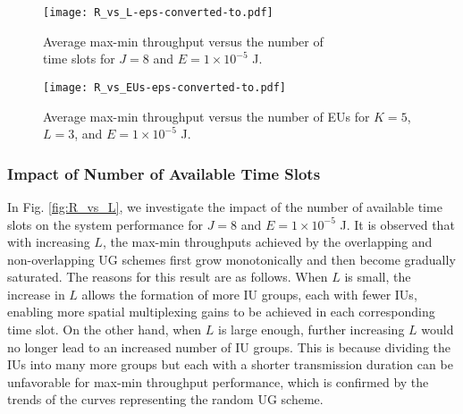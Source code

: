 \documentclass[12pt,draftclsnofoot, onecolumn]{IEEEtran}
\theoremstyle{plain}
\begin{document}
\begin{sloppypar}
\begin{figure}[!t]
	\begin{minipage}[t]{0.5\linewidth}
		\hspace{-3mm}
		\texttt{[image: R\_vs\_L-eps-converted-to.pdf]}\vspace{-1.5mm}
		\caption{Average max-min throughput versus the number of\\ time slots for $J = 8$ and $E = 1\times10^{-5}$ J.}
		\label{fig:R_vs_L}
	\end{minipage}%
	\begin{minipage}[t]{0.5\linewidth}
		\centering
		\texttt{[image: R\_vs\_EUs-eps-converted-to.pdf]}\vspace{-1.5mm}
		\caption{Average max-min throughput versus the number of EUs for $K = 5$, $L = 3$, and $E = 1\times10^{-5}$ J.}
		\label{fig:R_vs_EUs}
	\end{minipage}
	\vspace{-3mm}
\end{figure}

\subsubsection{Impact of Number of Available Time Slots}

In Fig. \ref{fig:R_vs_L}, we investigate the impact of the number of available time slots on the system performance for $J = 8$ and $E = 1 \times 10^{-5}$ J. It is observed that with increasing $L$, the max-min throughputs achieved by the overlapping and non-overlapping UG schemes first grow monotonically and then become gradually saturated. The reasons for this result are as follows. When $L$ is small, the increase in $L$ allows the formation of more IU groups, each with fewer IUs, enabling more spatial multiplexing gains to be achieved in each corresponding time slot. On the other hand, when $L$ is large enough, further increasing $L$ would no longer lead to an increased number of IU groups. This is because dividing the IUs into many more groups but each with a shorter transmission duration can be unfavorable for max-min throughput performance, which is confirmed by the trends of the curves representing the random UG scheme. %


\end{sloppypar}
\end{document}
